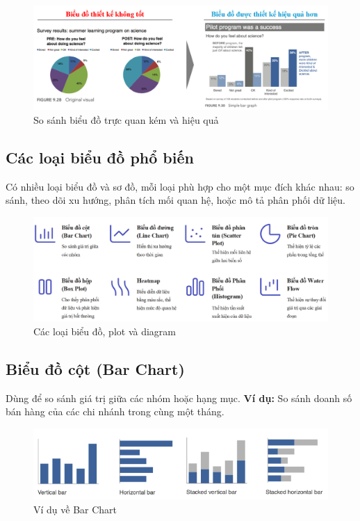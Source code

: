 \documentclass[11pt]{article}
\begin{document}
\begin{figure}[H]
    \centering
    \includegraphics[width=1\linewidth]{images/bad_and_good_charttype.png}
    \caption{So sánh biểu đồ trực quan kém và hiệu quả}
    \label{fig:good vs bad chart}
\end{figure}


\subsection{Các loại biểu đồ phổ biến}
Có nhiều loại biểu đồ và sơ đồ, mỗi loại phù hợp cho một mục đích khác nhau: so sánh, theo dõi xu hướng, phân tích mối quan hệ, hoặc mô tả phân phối dữ liệu.

\begin{figure}[H]
    \centering
    \includegraphics[width=1\linewidth]{images/visualization_chartTypes.png}
    \caption{Các loại biểu đồ, plot và diagram}
    \label{fig:chart, diagram and plot type}
\end{figure}

\subsection{Biểu đồ cột (Bar Chart)}
Dùng để so sánh giá trị giữa các nhóm hoặc hạng mục.
\textbf{Ví dụ:} So sánh doanh số bán hàng của các chi nhánh trong cùng một tháng.

\begin{figure}[H]
    \centering
    \includegraphics[width=0.9\linewidth]{images/barPlot.png}
    \caption{Ví dụ về Bar Chart}
    \label{fig:bar plot}
\end{figure}
\end{document}
